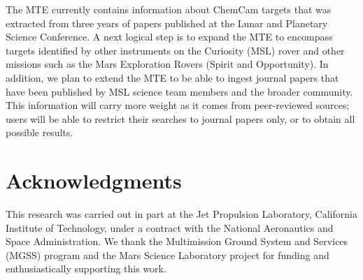 \documentclass[letterpaper]{article} %
\begin{document}
The MTE currently contains information about ChemCam targets that was
extracted from three years of papers published at the Lunar and
Planetary Science Conference.  A next logical step is to expand the
MTE to encompass targets identified by other instruments on the
Curiosity (MSL) rover and other missions such as the Mars Exploration
Rovers (Spirit and Opportunity).  In addition, we plan to extend the
MTE to be able to ingest journal papers that have been published by
MSL science team members and the broader community.  This information
will carry more weight as it comes from peer-reviewed sources; users
will be able to restrict their searches to journal papers only, or to
obtain all possible results.

\section{Acknowledgments}
This research was carried out in part at the Jet Propulsion Laboratory,
California Institute of Technology, under a contract with the National
Aeronautics and Space Administration.  
We thank the Multimission Ground System and Services (MGSS)
program and the Mars Science Laboratory project for funding and
enthusiastically supporting this work. 


\end{document}
